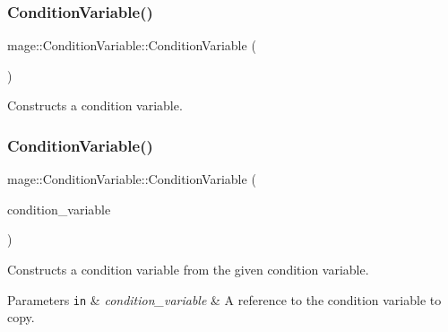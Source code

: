 \subsubsection{\texorpdfstring{Condition\+Variable()}{ConditionVariable()}\hspace{0.1cm}{\footnotesize\ttfamily [1/3]}}
{\footnotesize\ttfamily mage\+::\+Condition\+Variable\+::\+Condition\+Variable (\begin{DoxyParamCaption}{ }\end{DoxyParamCaption})\hspace{0.3cm}{\ttfamily [noexcept]}}

Constructs a condition variable. \hypertarget{structmage_1_1_condition_variable_add5ccf5807a94588c28621141df334d3}{}\label{structmage_1_1_condition_variable_add5ccf5807a94588c28621141df334d3} 
\subsubsection{\texorpdfstring{Condition\+Variable()}{ConditionVariable()}\hspace{0.1cm}{\footnotesize\ttfamily [2/3]}}
{\footnotesize\ttfamily mage\+::\+Condition\+Variable\+::\+Condition\+Variable (\begin{DoxyParamCaption}\item[{const \hyperlink{structmage_1_1_condition_variable}{Condition\+Variable} \&}]{condition\+\_\+variable }\end{DoxyParamCaption})\hspace{0.3cm}{\ttfamily [delete]}}

Constructs a condition variable from the given condition variable.


\begin{DoxyParams}[1]{Parameters}
\mbox{\tt in}  & {\em condition\+\_\+variable} & A reference to the condition variable to copy. \\
\hline
\end{DoxyParams}
\hypertarget{structmage_1_1_condition_variable_af9e62cadb0e6bc1c6473ffb1552bd6b2}{}\label{structmage_1_1_condition_variable_af9e62cadb0e6bc1c6473ffb1552bd6b2} 
